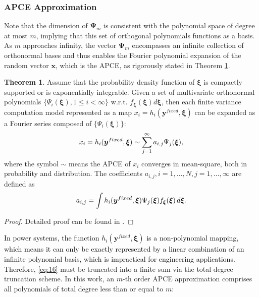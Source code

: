 \documentclass[journal]{IEEEtran}
\theoremstyle{definition}
\newtheorem{theorem}{Theorem}
\theoremstyle{remark}
\begin{document}
\subsubsection{APCE Approximation}
Note that the dimension of $\boldsymbol{\Psi}_m$ is consistent with the polynomial space of degree at most $m$, implying that this set of orthogonal polynomials functions as a basis. As $m$ approaches infinity, the vector $\boldsymbol{\Psi}_m$ encompasses an infinite collection of orthonormal bases and thus enables the Fourier polynomial expansion of the random vector $\boldsymbol{x}$, which is the APCE, as rigorously stated in Theorem \ref{the:1}.
\begin{theorem}\label{the:1}
Assume that the probability density function of $\boldsymbol{\xi}$ is compactly supported or is exponentially integrable. Given a set of multivariate orthonormal polynomials $\{\Psi_i(\boldsymbol{\xi}),1\leq i<\infty\}$ w.r.t. $f_{\boldsymbol{\xi}}(\boldsymbol{\xi})d\boldsymbol{\xi}$, then each finite variance computation model represented as a map \textcolor{black}{$x_i=h_i(\boldsymbol{y}^{fixed},\boldsymbol{\xi})$} can be expanded as a Fourier series composed of $\{\Psi_i(\boldsymbol{\xi})\}$:  
\begin{equation}\label{eq:16}
    \textcolor{black}{x_i=h_i(\boldsymbol{y}^{fixed},\boldsymbol{\xi})\sim \sum\limits_{j=1}^{\infty}a_{i,j}\Psi_j(\boldsymbol{\xi})},
\end{equation}
where the symbol $\sim$ means the APCE of $x_i$ converges in mean-square, both in probability and distribution.
The coefficients $a_{i,j},i=1,\dots,N,j=1,\dots,\infty$ are defined as
\begin{equation}
    \textcolor{black}{a_{i,j}=\int h_i(\boldsymbol{y}^{fixed},\boldsymbol{\xi})\Psi_j(\boldsymbol{\xi})f_{\boldsymbol{\xi}}(\boldsymbol{\xi}) \, d\boldsymbol{\xi}}.
\end{equation}
\end{theorem}
\begin{proof}
    Detailed proof can be found in \cite{rahman2018polynomial}.
\end{proof}\vspace{-5pt}
\textcolor{black}{In power systems, the function $h_i(\boldsymbol{y}^{fixed},\boldsymbol{\xi})$ is a non-polynomial mapping, which means it can only be exactly represented by a linear combination of an infinite polynomial basis, which is impractical for engineering applications. Therefore}, \eqref{eq:16} must be truncated into a finite sum via the total-degree truncation scheme. In this work, an $m$-th order APCE approximation comprises all polynomials of total degree less than or equal to $m$:
\end{document}
